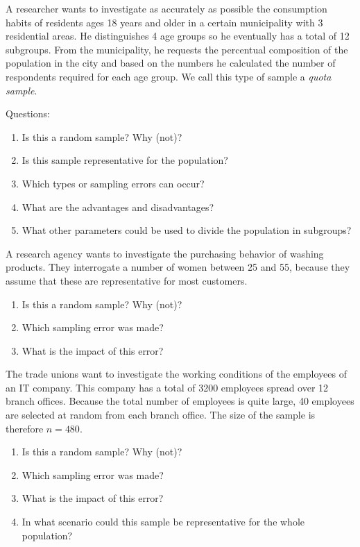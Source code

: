\begin{exercise}
    A researcher wants to investigate as accurately as possible the consumption habits of residents ages 18 years and older in a certain municipality with 3 residential areas. 
    He distinguishes 4 age groups so he eventually has a total of 12 subgroups. 
    From the municipality, he requests the percentual composition of the population in the city and based on the numbers he calculated the number of respondents required for each age group.
    We call this type of sample a \emph{quota sample}.
    
    Questions:
    \begin{enumerate}[label=\alph*.]
      \item Is this a random sample? Why (not)?
      \item Is this sample representative for the population?
      \item Which types or sampling errors can occur?
      \item What are the advantages and disadvantages?
      \item What other parameters could be used to divide the population in subgroups?
    \end{enumerate}
  \end{exercise}
  
  \begin{exercise}
    A research agency wants to investigate the purchasing behavior of washing products.
    They interrogate a number of women between 25 and 55, because they assume that these are representative for most customers.
    
    \begin{enumerate}[label=\alph*.]
      \item Is this a random sample? Why (not)?
      \item Which sampling error was made?
      \item What is the impact of this error?
    \end{enumerate}
  \end{exercise}
  
  \begin{exercise}

    

    The trade unions want to investigate the working conditions of the employees of an IT company.
    This company has a total of 3200 employees spread over 12 branch offices.
    Because the total number of employees is quite large, 40 employees are selected at random from each branch office.
    The size of the sample is therefore $ n = 480 $.
    
    \begin{enumerate}[label=\alph*.]
      \item Is this a random sample? Why (not)?
      \item Which sampling error was made?
      \item What is the impact of this error?
      \item In what scenario could this sample be representative for the whole population?
    \end{enumerate}
  \end{exercise}
  

